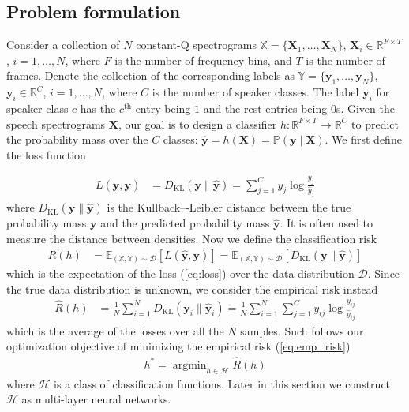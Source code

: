 \documentclass[a4paper]{article}
\DeclareMathOperator*{\argmin}{argmin}
\begin{document}
\subsection{Problem formulation}
Consider a collection of $N$ constant-Q spectrograms $\mathbb{X} = \{\mathbf{X}_1, \ldots, \mathbf{X}_N\}$, $\mathbf{X}_i \in \mathbb{R}^{F \times T}$, $i=1, \ldots, N$, where $F$ is the number of frequency bins, and $T$ is the number of frames. Denote the collection of the corresponding labels as $\mathbb{Y} = \{\mathbf{y}_1, \ldots, \mathbf{y}_N\}$, $\mathbf{y}_i \in \mathbb{R}^{C}$, $i=1,\ldots, N$, where $C$ is the number of speaker classes. The label $\mathbf{y}_i$ for speaker class $c$ has the $c^{\mathrm{th}}$ entry being $1$ and the rest entries being $0$s. Given the speech spectrograms $\mathbf{X}$, our goal is to design a classifier $h: \mathbb{R}^{F \times T} \to \mathbb{R}^{C}$ to predict the probability mass over the $C$ classes: $\widehat{\mathbf{y}} = h(\mathbf{X}) = \mathbb{P}(\mathbf{y} \mid \mathbf{X})$. We first define the loss function

\begin{align}
L(\widehat{\mathbf{y}}, \mathbf{y}) &= D_{\mathrm{KL}}(\mathbf{y} \parallel \widehat{\mathbf{y}}) = \sum_{j=1}^{C} y_j \log{\frac{y_j}{\widehat{y}_j}}
\label{eq:loss}
\end{align}
where $D_{\mathrm{KL}}(\mathbf{y} \parallel \widehat{\mathbf{y}})$ is the Kullback–-Leibler distance between the true probability mass $\mathbf{y}$ and the predicted probability mass $\widehat{\mathbf{y}}$. It is often used to measure the distance between densities. Now we define the classification risk
\begin{align}
R(h) &= \mathbb{E}_{(\mathbb{X}, \mathbb{Y}) \sim \mathcal{D}} \left[ L(\widehat{\mathbf{y}}, \mathbf{y}) \right] 
= \mathbb{E}_{(\mathbb{X}, \mathbb{Y}) \sim \mathcal{D}}\left[D_{\mathrm{KL}}(\mathbf{y} \parallel \widehat{\mathbf{y}})\right]
\label{eq:risk}
\end{align}
which is the expectation of the loss (\ref{eq:loss}) over the data distribution $\mathcal{D}$. Since the true data distribution is unknown, we consider the empirical risk instead
\begin{align}
\widehat{R}(h) &= \tfrac1{N} \sum_{i=1}^{N} D_{\mathrm{KL}}(\mathbf{y}_i \parallel \widehat{\mathbf{y}}_i) 
= \tfrac1{N} \sum_{i=1}^{N} \sum_{j=1}^{C} y_{ij} \log{\frac{y_{ij}}{\widehat{y}_{ij}}}
\label{eq:emp_risk}
\end{align}
which is the average of the losses over all the $N$ samples. Such follows our optimization objective of minimizing the empirical risk (\ref{eq:emp_risk})
\begin{align}
h^* = \argmin_{h \in \mathcal{H}}\widehat{R}(h)
\label{eq:obj}
\end{align}
where $\mathcal{H}$ is a class of classification functions. Later in this section we construct $\mathcal{H}$ as multi-layer neural networks.
\end{document}
